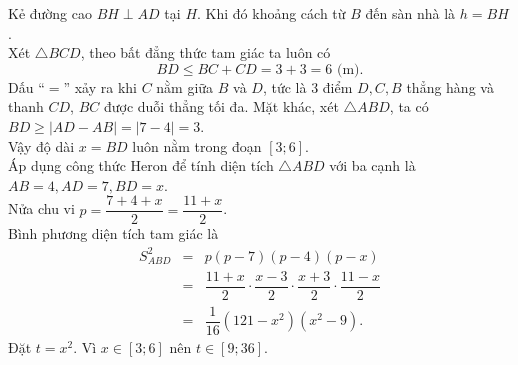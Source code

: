 \begin{ex}
{\begin{center}
		\end{center}
		Kẻ đường cao $BH \perp AD$ tại $H$. Khi đó khoảng cách từ $B$ đến sàn nhà là $h = BH$.\\
		Xét $\triangle BCD$, theo bất đẳng thức tam giác ta luôn có
		\[ BD \le BC + CD = 3 + 3 = 6 \text{ (m)}.\]
		Dấu ``$=$'' xảy ra khi $C$ nằm giữa $B$ và $D$, tức là $3$ điểm $D, C, B$ thẳng hàng và thanh $CD$, $BC$ được duỗi thẳng tối đa.
		Mặt khác, xét $\triangle ABD$, ta có $BD \ge |AD - AB| = |7 - 4| = 3$.\\
		Vậy độ dài $x = BD$ luôn nằm trong đoạn $[3; 6]$.\\
		Áp dụng công thức Heron để tính diện tích $\triangle ABD$ với ba cạnh là $AB=4, AD=7, BD=x$.\\
		Nửa chu vi $p = \dfrac{7 + 4 + x}{2} = \dfrac{11 + x}{2}$.\\
		Bình phương diện tích tam giác là
		\begin{eqnarray*}
			S_{ABD}^2 &=& p(p - 7)(p - 4)(p - x) \\
			&=& \dfrac{11 + x}{2} \cdot \dfrac{x - 3}{2} \cdot \dfrac{x + 3}{2} \cdot \dfrac{11 - x}{2} \\
			&=& \dfrac{1}{16} \left( 121 - x^2 \right) \left( x^2 - 9 \right).
		\end{eqnarray*}
		Đặt $t = x^2$. Vì $x \in [3; 6]$ nên $t \in [9; 36]$.\\
}
\end{ex}
